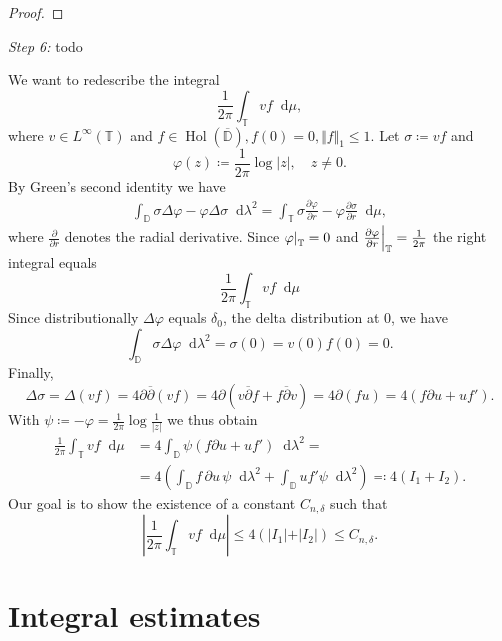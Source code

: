 \documentclass[letterpaper, 11pt]{article}
\newcommand{\D}{\mathbb{D}}
\newcommand{\T}{\mathbb{T}}
\newcommand{\1}{\mathds{1}}
\newcommand{\diff}{\mathop{}\!\mathrm{d}}
\newcommand{\cl}[1]{\overline{#1}}
\newcommand{\restr}[2]{{%
  \left.\kern-\nulldelimiterspace %
  #1 %
  \littletaller %
  \right|_{#2} %
  }}
\newcommand{\littletaller}{\mathchoice{\vphantom{\big|}}{}{}{}}
\newcommand{\wirtz}{\partial}
\newcommand{\wirtzbar}{\overline{\partial}}
\DeclareMathOperator*{\Hol}{Hol}
\theoremstyle{definition}
\newenvironment{innerproof}
 {\renewcommand{\qedsymbol}{}\proof}
 {\endproof}
\begin{document}
\begin{proof}
\end{proof}

\begin{innerproof}[Proof (continued)] \textit{Step 6:} todo

  We want to redescribe the integral
  $$ \frac{1}{2\pi} \int_\T v f \diff \mu, $$
  where $v \in L^\infty(\T)$ and $f \in \Hol(\cl{\D}), f(0) = 0, \Vert f \Vert_1 \leq 1$. Let $\sigma \coloneqq v f$ and
  $$ \varphi(z) \coloneqq \frac{1}{2\pi} \log \vert z \vert, \quad z \neq 0. $$
  By Green's second identity we have
  \begin{align*}
    \int_\D \sigma \Delta \varphi - \varphi \Delta \sigma \diff \lambda^2 = \int_\T \sigma \frac{\partial \varphi}{\partial r} - \varphi \frac{\partial \sigma}{\partial r} \diff \mu,
  \end{align*}
  where $\frac{\partial}{\partial r}$ denotes the radial derivative.
  Since $\restr{\varphi}{\T} = 0$ and $\restr{\frac{\partial \varphi}{\partial r}}{\T} = \frac{1}{2 \pi}$ the right integral equals
  $$ \frac{1}{2 \pi} \int_\T v f \diff \mu $$
  Since distributionally $\Delta \varphi$ equals $\delta_0$, the delta distribution at 0, we have
  $$ \int_\D \sigma \Delta \varphi \diff \lambda^2 = \sigma(0) = v(0) f(0) = 0. $$
  Finally,
  $$ \Delta \sigma = \Delta (v f) = 4 \wirtz \wirtzbar (v f) = 4 \wirtz (v \wirtzbar f + f \wirtzbar v) = 4\wirtz(f u) = 4(f \partial u + u f'). $$
  With $\psi \coloneqq -\varphi = \frac{1}{2\pi} \log \frac{1}{\vert z \vert}$ we thus obtain
  \begin{align*}
    \frac{1}{2 \pi} \int_\T v f \diff \mu &= 4 \int_\D \psi \left( f \partial u + u f' \right) \diff \lambda^2 = \\ 
    &= 4 \left( \int_\D f \, \partial u \, \psi \diff \lambda^2 + \int_\D u f' \psi \diff \lambda^2 \right) \eqqcolon 4 (I_1 + I_2).
  \end{align*}
  Our goal is to show the existence of a constant $C_{n,\delta}$ such that
  $$ \left\vert \frac{1}{2 \pi} \int_\T v f \diff \mu \right\vert \leq 4 (\vert I_1 \vert + \vert I_2 \vert) \leq C_{n,\delta}. $$
\end{innerproof}

\section{Integral estimates}
\end{document}
